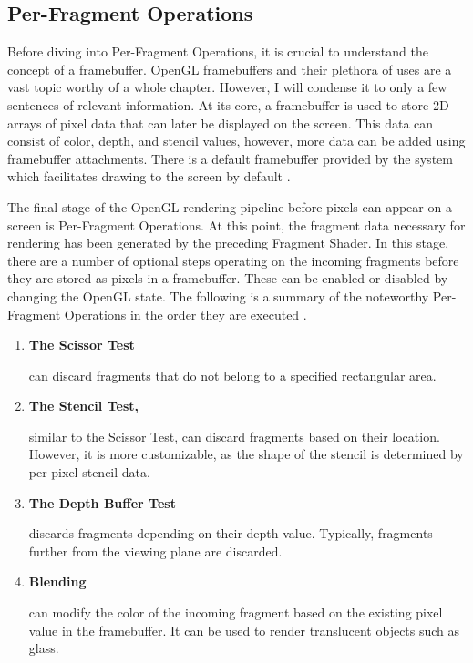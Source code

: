 \documentclass[
  digital,     %
  oneside,     %
  nosansbold,  %
  nocolorbold, %
  lof,         %
  lot,         %
]{fithesis4}
\begin{document}
\subsection{Per-Fragment Operations}
Before diving into Per-Fragment Operations, it is crucial to understand the concept of a framebuffer.
OpenGL framebuffers and their plethora of uses are a vast topic worthy of a whole chapter.
However, I will condense it to only a few sentences of relevant information.
At its core, a framebuffer is used to store 2D arrays of pixel data that can later be displayed on the screen.
This data can consist of color, depth, and stencil values, however, more data can be added using framebuffer
attachments. There is a default framebuffer provided by the system which facilitates drawing to the screen by default \cite{opengl-spec}.

The final stage of the OpenGL rendering pipeline before pixels can appear on a screen is Per-Fragment Operations.
At this point, the fragment data necessary for
rendering has been generated by the preceding Fragment Shader. In this stage, there are a number
of optional steps operating on the incoming fragments before they are stored as pixels in a framebuffer.
These can be enabled or disabled by changing the OpenGL state.
The following is a summary of the noteworthy Per-Fragment Operations in the order they are executed
\cite[p.46]{opengl-superbible}.

\begin{enumerate}
    \item \textbf{The Scissor Test}

    can discard fragments that do not belong to a specified rectangular area.

    \item \textbf{The Stencil Test,}

    similar to the Scissor Test, can discard fragments based on their location. However, it is more customizable,
    as the shape of the stencil is determined by per-pixel stencil data.
    
    \item \textbf{The Depth Buffer Test}

    discards fragments depending on their depth value. Typically, fragments further from the viewing plane are discarded.
    
    \item \textbf{Blending}

    can modify the color of the incoming fragment based on the existing pixel value in the framebuffer.
    It can be used to render translucent objects such as glass.
\end{enumerate}
\end{document}
